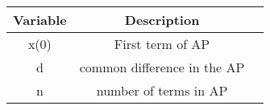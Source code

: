 \begin{tabular}{|c|c|c|}
    \hline
    \textbf{Variable} & \textbf{Description}\\
    \hline
    x(0) & First term of AP\\
    \hline
    d & common difference in the AP\\
    \hline
    n & number of terms in AP\\
    \hline
\end{tabular}

